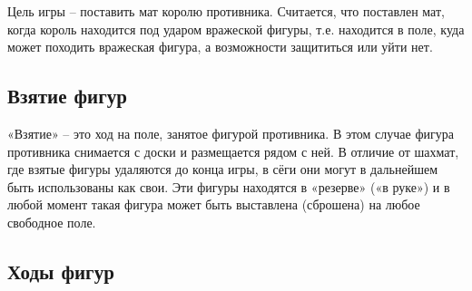 Цель игры – поставить мат королю противника. Считается, что поставлен мат, когда король находится под ударом вражеской фигуры, т.е. находится в поле, куда может походить вражеская фигура, а возможности защититься или уйти нет.

\subsection{Взятие фигур}

«Взятие» – это ход на поле, занятое фигурой противника. В этом случае фигура противника снимается с доски и размещается рядом с ней. В отличие от шахмат, где взятые фигуры удаляются до конца игры, в сёги они могут в дальнейшем быть использованы как свои. Эти фигуры находятся в «резерве» («в руке») и в любой момент такая фигура может быть выставлена (сброшена) на любое свободное поле. 

\subsection{Ходы фигур}


